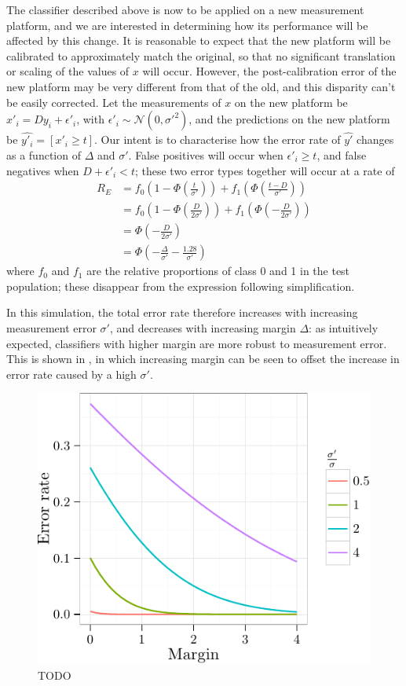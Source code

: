 \documentclass[dissertation.tex]{subfiles}
\begin{document}
The classifier described above is now to be applied on a new measurement platform, and we are interested in determining how its performance will be affected by this change.  It is reasonable to expect that the new platform will be calibrated to approximately match the original, so that no significant translation or scaling of the values of $x$ will occur.  However, the post-calibration error of the new platform may be very different from that of the old, and this disparity can't be easily corrected.  Let the measurements of $x$ on the new platform be $x'_i = D y_i + \epsilon'_i$, with $\epsilon'_i \sim \mathcal{N}(0, \sigma'^2)$, and the predictions on the new platform be $\hat{y'_i} = [x'_i \geq t]$.  Our intent is to characterise how the error rate of $\hat{y'}$ changes as a function of $\Delta$ and $\sigma'$.  False positives will occur when $\epsilon'_i \geq t$, and false negatives when $D + \epsilon'_i < t$; these two error types together will occur at a rate of
\begin{align*}
R_E &= f_0\left(1-\Phi\left(\frac{t}{\sigma'}\right)\right) + f_1\left(\Phi\left(\frac{t-D}{\sigma'}\right)\right) \\
    &= f_0\left(1-\Phi\left(\frac{D}{2\sigma'}\right)\right) + f_1\left(\Phi\left(-\frac{D}{2\sigma'}\right)\right) \\
    &= \Phi\left(-\frac{D}{2\sigma'}\right) \\
    &= \Phi\left(-\frac{\Delta}{\sigma'} - \frac{1.28}{\sigma'}\right)
\end{align*}
where $f_0$ and $f_1$ are the relative proportions of class 0 and 1 in the test population; these disappear from the expression following simplification.

In this simulation, the total error rate therefore increases with increasing measurement error $\sigma'$, and decreases with increasing margin $\Delta$: as intuitively expected, classifiers with higher margin are more robust to measurement error.  This is shown in , in which increasing margin can be seen to offset the increase in error rate caused by a high $\sigma'$.

\begin{figure}[!htbp]
\centering
\includegraphics[width=.7\linewidth]{analysis/messina/figure/05-E1-E1A3-1}
\caption[TODO]{TODO}\label{fig:mess-margin-good}
\end{figure}
\end{document}
